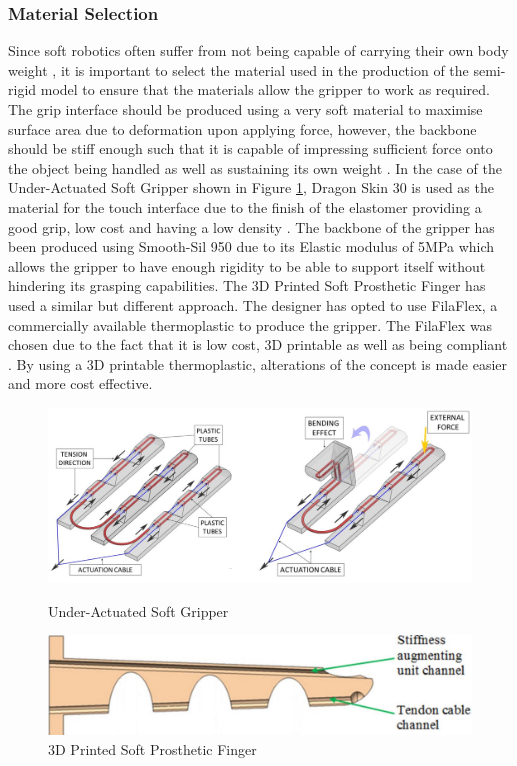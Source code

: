 \documentclass[11pt,twocolumn]{article}
\begin{document}
\subsubsection{Material Selection}
Since soft robotics often suffer from not being capable of carrying their own body weight \cite{mutlu2016mechanical}, it is important to select the material used in the production of the semi-rigid model to ensure that the materials allow the gripper to work as required. The grip interface should be produced using a very soft material to maximise surface area due to deformation upon applying force, however, the backbone should be stiff enough such that it is capable of impressing sufficient force onto the object being handled as well as sustaining its own weight \cite{hassan2015design}. In the case of the Under-Actuated Soft Gripper shown in Figure \ref{fig:Tendon2}, Dragon Skin 30 is used as the material for the touch interface due to the finish of the elastomer providing a good grip, low cost and having a low density \cite{hassan2015design}. The backbone of the gripper has been produced using Smooth-Sil 950 due to its Elastic modulus of 5MPa which allows the gripper to have enough rigidity to be able to support itself without hindering its grasping capabilities. The 3D Printed Soft Prosthetic Finger has used a similar but different approach. The designer has opted to use FilaFlex, a commercially available thermoplastic to produce the gripper. The FilaFlex was chosen due to the fact that it is low cost, 3D printable as well as being compliant \cite{mutlu2016mechanical}. By using a 3D printable thermoplastic, alterations of the  concept is made easier and more cost effective.
\begin{figure}[!h]
\centering
\begin{minipage}[b]{.55\textwidth}
\includegraphics[width=\linewidth]{Tendon}
\caption{Under-Actuated Soft Gripper}
\label{fig:Tendon}
\end{minipage}
\hfill
\begin{minipage}[b]{0.35\textwidth}
\includegraphics[width=1.15\linewidth]{Tendon2}
\caption{3D Printed Soft Prosthetic Finger}
\label{fig:Tendon2}
\end{minipage}
\end{figure}
\end{document}
